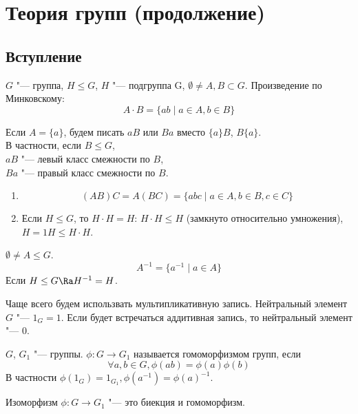 ﻿\chapter{Теория групп (продолжение)}

\section{Вступление}

\begin{Def}
	$G$ "--- группа, $H \le G$, $H$ "--- подгруппа G, $\emptyset \ne A, B \subset G$.
	Произведение по Минковскому:
	\[ A \cdot B = \{ab \mid a \in A, b \in B\} \]

	Если $A = \{a\}$, будем писать $aB$ или $Ba$ вместо $\{a\}B$, $B\{a\}$.\\
	В частности, если $B \le G$,\\
	$aB$ "--- левый класс смежности по $B$,\\
	$Ba$ "--- правый класс смежности по $B$.\\
\end{Def}

\begin{conseq}\hfill
	\begin{enumerate}
	\item
		\[ (AB)C = A(BC) = \{abc \mid a \in A, b \in B, c \in C\} \]

	\item
		Если $H \le G$, то $H \cdot H = H$:
		$H \cdot H \le H$ (замкнуто относительно умножения), $H = 1H \le H \cdot H$.
	\end{enumerate}
\end{conseq}

\begin{Def}
	$\emptyset \ne A \le G$.
	\[ A^{-1} = \{a^{-1} \mid a \in A\} \]
	Если $H \le G \Ra H^{-1} = H$.
\end{Def}

\begin{Rem}
	Чаще всего будем использвать мультипликативную запись.
	Нейтральный элемент $G$ "--- $1_{G} = 1$.
	Если будет встречаться аддитивная запись, то нейтральный элемент "--- $0$.
\end{Rem}

\begin{Def}
	$G$, $G_1$ "--- группы.
	$\phi \colon G \to G_1$ называется гомоморфизмом групп, если
	\[ \forall a, b \in G, \phi(ab) = \phi(a) \phi(b) \]
	В частности $\phi(1_G) = 1_{G_1}, \phi(a^{-1}) = \phi(a)^{-1}$.

	Изоморфизм $\phi\colon G \to G_1$ "--- это биекция и гомоморфизм.
\end{Def}

